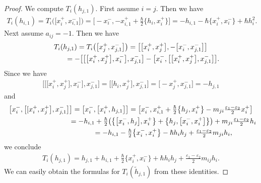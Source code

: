 \documentclass[10pt,a4paper]{amsart}
\theoremstyle{definition}
\numberwithin{equation}{section}
\newcommand{\ve}{\varepsilon}
\begin{document}
\begin{proof}
We compute $T_{i}(h_{j,1})$. First assume $i=j$. Then we have
\begin{gather*}
T_i(h_{i,1}) = T_i\big(\big[x_{i}^+,x_{i,1}^-\big]\big) = \big[{-}x_{i}^-, -x_{i,1}^+ + \tfrac{\hbar}{2}\big\{ h_i, x_i^+ \big\}\big] = -h_{i,1} - \hbar \big\{x_i^+,x_i^-\big\} + \hbar h_i^2.
\end{gather*}
Next assume $a_{ij}=-1$. Then we have
\begin{gather*}
T_i(h_{j,1}) = T_i\big(\big[x_{j}^+,x_{j,1}^-\big]\big) = \big[\big[x_i^+,x_{j}^+\big], -\big[x_i^-,x_{j,1}^-\big]\big] \\
\hphantom{T_i(h_{j,1})}{} = - \big[\big[\big[x_i^+,x_j^+\big],x_i^-\big],x_{j,1}^-\big]-\big[x_i^-,\big[\big[x_i^+,x_j^+\big],x_{j,1}^-\big]\big].
\end{gather*}
Since we have
\begin{gather*}
\big[\big[\big[x_i^+,x_j^+\big],x_i^-\big],x_{j,1}^-\big]=\big[\big[h_i,x_j^+\big],x_{j,1}^-\big]=\big[{-}x_j^+,x_{j,1}^-\big]=-h_{j,1}
\end{gather*}
and
\begin{gather*}
\big[x_i^-,\big[[x_i^+,x_j^+\big],x_{j,1}^-\big]\big] =\big[x_i^-,\big[x_i^+,h_{j,1}\big]\big] = \big[x_i^-,x_{i,1}^++\tfrac{\hbar}{2}\big\{h_j,x_i^+\big\}-m_{ji}\tfrac{\ve_1 - \ve_2}{2} x_i^+\big] \\
\hphantom{\big[x_i^-,\big[[x_i^+,x_j^+\big],x_{j,1}^-\big]\big]}{} = -h_{i,1} + \tfrac{\hbar}{2}\big( \big\{\big[x_i^-,h_j\big],x_i^+\big\} + \big\{ h_j, \big[x_i^-, x_i^+\big] \big\}\big) + m_{ji}\tfrac{\ve_1 - \ve_2}{2} h_i \\
\hphantom{\big[x_i^-,\big[[x_i^+,x_j^+\big],x_{j,1}^-\big]\big]}{} = -h_{i,1} - \tfrac{\hbar}{2} \big\{x_i^-,x_i^+\big\} - \hbar h_i h_j + \tfrac{\ve_1 - \ve_2}{2}m_{ji} h_i,
\end{gather*}
we conclude
\begin{gather*}
T_i(h_{j,1})=h_{j,1}+h_{i,1}+\tfrac{\hbar}{2} \big\{x_i^+,x_i^-\big\} + \hbar h_i h_j + \tfrac{\ve_1 - \ve_2}{2}m_{ij} h_i.
\end{gather*}
We can easily obtain the formulas for $T_{i}(\tilde{h}_{j,1})$ from these identities.
\end{proof}
\end{document}

